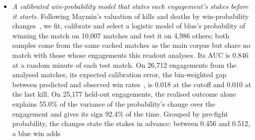\begin{itemize}
\item \emph{A calibrated win-probability model that states each engagement's stakes before it
  starts.} Following Maymin's valuation of kills and deaths by win-probability
  changes~\cite{maymin2021smart}, we fit, calibrate and select a logistic model of blue's probability
  of winning the match on 10,007 matches and test it on 4,986 others; both samples come from the same
  cached matches as the main corpus but share no match with those whose engagements this readout
  analyses. Its AUC is 0.846 at a random minute of each test match. On 26,712 engagements from the analysed matches, its
  expected calibration error, the bin-weighted gap between predicted and observed win
  rates~\cite{naeini2015obtaining}, is 0.018 at the cutoff and 0.010 at the last kill. On 25,177
  held-out engagements, the realised outcome alone explains 55.0\% of the variance of the
  probability's change over the engagement and gives its sign 92.4\% of the time. Grouped by pre-fight
  probability, the changes state the stakes in advance: between 0.456 and 0.512, a blue win adds

\end{itemize}
